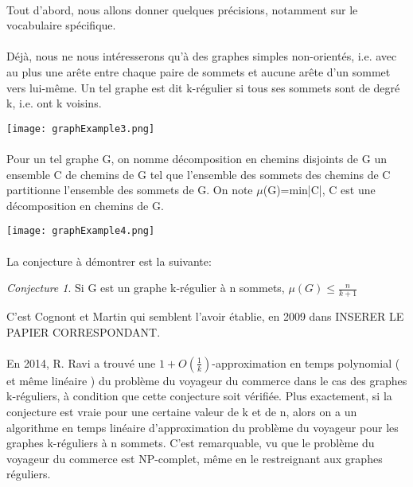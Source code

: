\documentclass[a4paper]{article}
\theoremstyle{definition}
\theoremstyle{remark}
\newtheorem{conjecture}{Conjecture}[section]
\begin{document}
\paragraph{}
Tout d'abord, nous allons donner quelques précisions, notamment sur le vocabulaire spécifique.


\paragraph{}
Déjà, nous ne nous intéresserons qu'à des graphes simples non-orientés, i.e. avec au plus une arête entre chaque paire de sommets et aucune arête
d'un sommet vers lui-même. Un tel graphe est dit k-régulier si tous ses
sommets sont de degré k, i.e. ont k voisins.


\texttt{[image: graphExample3.png]}


\paragraph{}
Pour un tel graphe G, on nomme décomposition en chemins disjoints de G  un ensemble C de chemins de G tel que l'ensemble des sommets des chemins 
de C partitionne l'ensemble des sommets de G. On note
$\mu$(G)=min{|C|, C est une décomposition en chemins de G}.

\texttt{[image: graphExample4.png]}


\paragraph{}
La conjecture à démontrer est la suivante:
\begin{conjecture}
Si G est un graphe k-régulier à n sommets, $\mu(G) \leq \frac{n}{k+1}$
\end{conjecture}
C'est Cognont et Martin qui semblent l'avoir établie, en 2009 dans INSERER LE PAPIER CORRESPONDANT.


\paragraph{}
En 2014, R. Ravi a trouvé une $1 + O(\frac{1}{k})$-approximation en
temps polynomial ( et même linéaire ) du problème du voyageur du 
commerce dans le cas des graphes k-réguliers, à condition que cette 
conjecture soit vérifiée. Plus exactement, si la conjecture est vraie
pour une certaine valeur de k et de n, alors on a un algorithme en
temps linéaire d'approximation du problème du voyageur pour les graphes
k-réguliers à n sommets. C'est remarquable, vu que le problème du 
voyageur du commerce est NP-complet, même en le restreignant aux graphes
réguliers.
\end{document}
